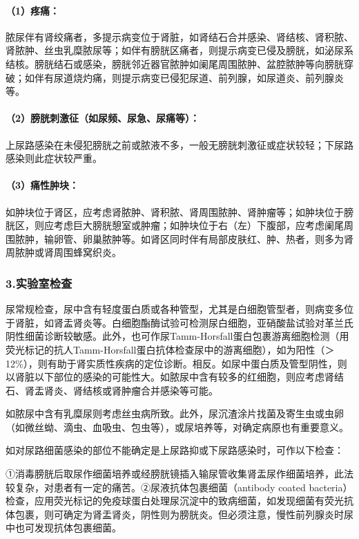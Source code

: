 \paragraph{（1）疼痛：}

脓尿伴有肾绞痛者，多提示病变位于肾脏，如肾结石合并感染、肾结核、肾积脓、肾脓肿、丝虫乳糜脓尿等；如伴有膀胱区痛者，则提示病变已侵及膀胱，如泌尿系结核。膀胱结石或感染，膀胱邻近器官脓肿如阑尾周围脓肿、盆腔脓肿等向膀胱穿破；如伴有尿道烧灼痛，则提示病变已侵犯尿道、前列腺，如尿道炎、前列腺炎等。

\paragraph{（2）膀胱刺激征（如尿频、尿急、尿痛等）：}

上尿路感染在未侵犯膀胱之前或脓液不多，一般无膀胱刺激征或症状较轻；下尿路感染则此症状较严重。

\paragraph{（3）痛性肿块：}

如肿块位于肾区，应考虑肾脓肿、肾积脓、肾周围脓肿、肾肿瘤等；如肿块位于膀胱区，则应考虑巨大膀胱憩室或肿瘤；如肿块位于右（左）下腹部，应考虑阑尾周围脓肿，输卵管、卵巢脓肿等。如肾区同时伴有局部皮肤红、肿、热者，则多为肾周脓肿或肾周围蜂窝织炎。

\subsubsection{3.实验室检查}

尿常规检查，尿中含有轻度蛋白质或各种管型，尤其是白细胞管型者，则病变多位于肾脏，如肾盂肾炎等。白细胞酯酶试验可检测尿白细胞，亚硝酸盐试验对革兰氏阴性细菌诊断较敏感。此外，也可作尿Tamm-Horsfall蛋白包裹游离细胞检测（用荧光标记的抗人Tamm-Horsfall蛋白抗体检查尿中的游离细胞），如为阳性（＞12\%），则有助于肾实质性疾病的定位诊断。相反。如尿中蛋白质及管型阴性，则以肾脏以下部位的感染的可能性大。如脓尿中含有较多的红细胞，则应考虑肾结石、肾盂肾炎、肾结核或肾肿瘤合并感染等可能。

如脓尿中含有乳糜尿则考虑丝虫病所致。此外，尿沉渣涂片找菌及寄生虫或虫卵（如微丝蚴、滴虫、血吸虫、包虫等），或尿培养等，对确定病原也有重要意义。

如对尿路细菌感染的部位不能确定是上尿路抑或下尿路感染时，可作以下检查：

①消毒膀胱后取尿作细菌培养或经膀胱镜插入输尿管收集肾盂尿作细菌培养，此法较复杂，对患者有一定的痛苦。②尿液抗体包裹细菌（antibody
coated
bacteria）检查，应用荧光标记的免疫球蛋白处理尿沉淀中的致病细菌，如发现细菌有荧光抗体包裹，则可确定为肾盂肾炎，阴性则为膀胱炎。但必须注意，慢性前列腺炎时尿中也可发现抗体包裹细菌。

